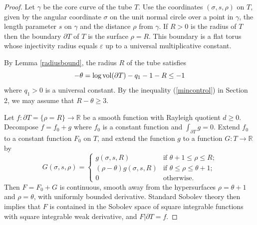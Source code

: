 \documentclass[11pt]{amsart}
\theoremstyle{plain}
\theoremstyle{plain}
\theoremstyle{definition}
\renewcommand{\epsilon}{\varepsilon}
\begin{document}
\begin{proof} Let $\gamma$ be the core curve of the tube $T$.
Use the coordinates 
$(\sigma,s,\rho)$ on $T$, given by the angular coordinate
$\sigma$ on the unit normal circle over a point in $\gamma$, the length
parameter $s$ on $\gamma$ and the distance $\rho$ from $\gamma$. 
If $R>0$ is the radius of $T$ then 
the boundary $\partial T$ of $T$ is the surface
$\rho=R$. This boundary is a flat torus whose injectivity
radius equals $\epsilon$ up to a universal multiplicative
constant. 

By Lemma \ref{radiusbound}, 
the radius $R$ of the tube satisfies
\[-\theta=\log{\rm vol}(\partial T)  -q_1-1-R\leq -1\] where 
$q_1>0$ is a universal constant.  By the inequality
(\ref{mincontrol}) in Section 2, we 
may assume that 
$R-\theta \geq 3$.

Let $f:\partial T=\{\rho=R\}\to \mathbb{R}$ be a smooth function
with Rayleigh quotient $d\geq 0$. 
Decompose $f=f_0+g$ 
where $f_0$ is a constant function and $\int_{\partial T} g=0$. 
Extend $f_0$ to a constant
function $F_0$ on $T$, and extend the function $g$  
to a function $G:T\to \mathbb{R}$ by
\begin{equation}
G(\sigma,s,\rho)=
\begin{cases}
g(\sigma,s,R) &\text{if $\theta+1\leq \rho\leq R$;}\\
(\rho-\theta) g(\sigma,s,R) &\text{if 
$\theta\leq \rho\leq \theta +1$;}\\
0 &\text{otherwise.}
\end{cases}
\end{equation}
Then $F=F_0+G$ is continuous, smooth away from the hypersurfaces
$\rho=\theta+1$ and $\rho=\theta$, with uniformly bounded derivative.
Standard Sobolev theory then implies that $F$ is 
contained in the Sobolev space
of square integrable functions with square integrable weak derivative,
and $F\vert \partial T=f$.


\end{proof}
\end{document}

